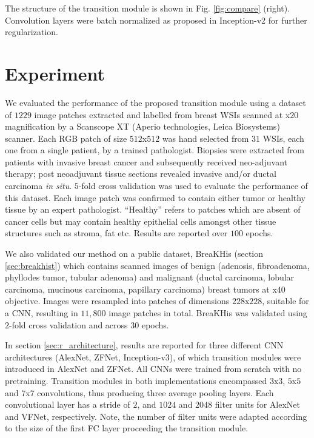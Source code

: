 \documentclass[runningheads,a4paper]{llncs}
\begin{document}
The structure of the transition module is shown in Fig. \ref{fig:compare} (right). Convolution layers were batch normalized as proposed in Inception-v2 for further regularization.

\section{Experiment}


We evaluated the performance of the proposed transition module using a dataset of $1229$ image patches extracted and labelled from breast WSIs scanned at x$20$ magnification by a Scanscope XT (Aperio technologies, Leica Biosystems) scanner. Each RGB patch of size $512$x$512$ was hand selected from $31$ WSIs, each one from a single patient, by a trained pathologist. Biopsies were extracted from patients with invasive breast cancer and subsequently received neo-adjuvant therapy; post neoadjuvant tissue sections revealed invasive and/or ductal carcinoma \emph{in situ}. 
$5$-fold cross validation was used to evaluate the performance of this dataset. Each image patch was confirmed to contain either tumor or healthy tissue by an expert pathologist. ``Healthy'' refers to patches which are absent of cancer cells but may contain healthy epithelial cells amongst other tissue structures such as stroma, fat etc. Results are reported over $100$ epochs. 

We also validated our method on a public dataset, BreaKHis \cite{Spanhol2016b} (section \ref{sec:breakhist}) which contains scanned images of benign (adenosis, fibroadenoma, phyllodes tumor, tubular adenoma) and malignant (ductal carcinoma, lobular carcinoma, mucinous carcinoma, papillary carcinoma) breast tumors at x$40$ objective. Images were resampled into patches of dimensions $228$x$228$, suitable for a CNN, resulting in $11,800$ image patches in total. BreaKHis was validated using $2$-fold cross validation and across $30$ epochs. 


In section \ref{sec:r_architecture}, results are reported for three different CNN architectures (AlexNet, ZFNet, Inception-v3), of which transition modules were introduced in AlexNet and ZFNet. All CNNs were trained from scratch with no pretraining. Transition modules in both implementations encompassed $3$x$3$, $5$x$5$ and $7$x$7$ convolutions, thus producing three average pooling layers. Each convolutional layer has a stride of $2$, and $1024$ and $2048$ filter units for AlexNet and VFNet, respectively. Note, the number of filter units were adapted according to the size of the first FC layer proceeding the transition module.
\end{document}
